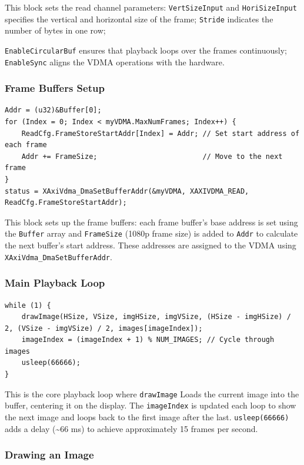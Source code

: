 \documentclass{article}
\begin{document}
This block sets the read channel parameters: \verb|VertSizeInput| and \verb|HoriSizeInput| specifies the vertical and horizontal size of the frame; \verb|Stride| indicates the number of bytes in one row; 

\verb|EnableCircularBuf| ensures that playback loops over the frames continuously; \verb|EnableSync| aligns the VDMA operations with the hardware.

\subsubsection{Frame Buffers Setup}

\begin{verbatim}
Addr = (u32)&Buffer[0];
for (Index = 0; Index < myVDMA.MaxNumFrames; Index++) {
    ReadCfg.FrameStoreStartAddr[Index] = Addr; // Set start address of each frame
    Addr += FrameSize;                         // Move to the next frame
}
status = XAxiVdma_DmaSetBufferAddr(&myVDMA, XAXIVDMA_READ, ReadCfg.FrameStoreStartAddr);
\end{verbatim}

This block sets up the frame buffers: each frame buffer's base address is set using the \verb|Buffer| array and \verb|FrameSize| (1080p frame size) is added to \verb|Addr| to calculate the next buffer's start address. These addresses are assigned to the VDMA using \verb|XAxiVdma_DmaSetBufferAddr|.

\subsubsection{Main Playback Loop}

\begin{verbatim}
while (1) {
    drawImage(HSize, VSize, imgHSize, imgVSize, (HSize - imgHSize) / 2, (VSize - imgVSize) / 2, images[imageIndex]);
    imageIndex = (imageIndex + 1) % NUM_IMAGES; // Cycle through images
    usleep(66666);
}
\end{verbatim}

This is the core playback loop where \verb|drawImage| Loads the current image into the buffer, centering it on the display. The \verb|imageIndex| is updated each loop to show the next image and loops back to the first image after the last.
\verb|usleep(66666)| adds a delay (\textasciitilde66 ms) to achieve approximately 15 frames per second.

\subsubsection{Drawing an Image}
\end{document}
